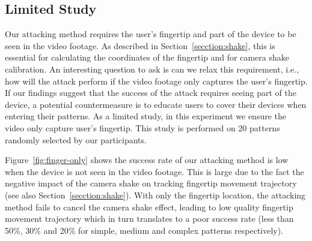 \subsection{Limited Study}
\label{section: limited-study}

Our attacking method requires the user's fingertip and part of the device to be seen in the video footage.  As
described in Section~\ref{secction:shake}, this is essential for calculating the coordinates of the fingertip and for
camera shake calibration. An interesting question to ask is can we relax this requirement, i.e., how will the attack
perform if the video footage only captures the user's fingertip. If our findings
suggest that the success of the attack requires seeing part of the device, a potential countermeasure is to educate users to cover their devices when entering their patterns.
As a limited study, in this experiment we ensure the video only capture user's fingertip. This study is performed on 20 patterns randomly selected by our participants.

Figure~\ref{fig:finger-only} shows the success rate of our attacking method is low when the device is not seen in the video footage.
This is large due to the fact the negative impact of the camera shake on tracking fingertip movement trajectory (see also Section~\ref{secction:shake}).
With only the fingertip location, the attacking method fails to cancel the camera shake effect, leading to low quality fingertip movement trajectory
which in turn translates to a poor success rate (less than 50\%, 30\% and 20\% for simple, medium and complex patterns respectively).


